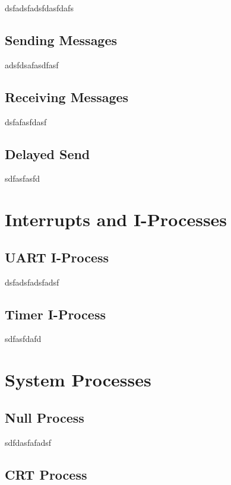 \documentclass[12pt]{report}
\begin{document}
dsfadsfadsfdasfdafs

\subsection{Sending Messages}

adsfdsafasdfasf

\subsection{Receiving Messages}

dsfafasfdasf

\subsection{Delayed Send}


sdfasfasfd


\section{Interrupts and I-Processes}

\subsection{UART I-Process}

dsfadsfadsfadsf

\subsection{Timer I-Process}

sdfasfdafd


\section{System Processes}

\subsection{Null Process}

sdfdasfafadsf

\subsection{CRT Process}
\end{document}
